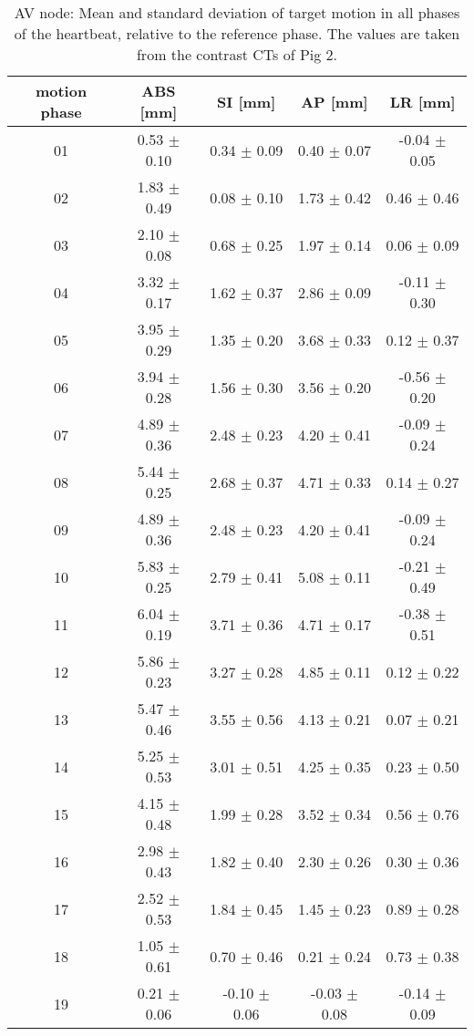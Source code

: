 \begin{table}[H]
  \centering
  \scriptsize
  \caption{AV node: Mean and standard deviation of target motion in all phases of the heartbeat, relative to the reference phase. The values are 
  taken from the contrast CTs of Pig 2.}
  \begin{tabular}{|c|c|c|c|c|}
    \hline\hline
    motion phase\rule{0pt}{2.6ex}\rule[-1.2ex]{0pt}{0pt} & ABS [mm] & SI [mm] & AP [mm] & LR [mm]\\
    \hline
01 &0.53 $\pm$ 0.10 &0.34 $\pm$ 0.09 &0.40 $\pm$ 0.07 &-0.04 $\pm$ 0.05 \\
02 &1.83 $\pm$ 0.49 &0.08 $\pm$ 0.10 &1.73 $\pm$ 0.42 &0.46 $\pm$ 0.46 \\
03 &2.10 $\pm$ 0.08 &0.68 $\pm$ 0.25 &1.97 $\pm$ 0.14 &0.06 $\pm$ 0.09 \\
04 &3.32 $\pm$ 0.17 &1.62 $\pm$ 0.37 &2.86 $\pm$ 0.09 &-0.11 $\pm$ 0.30 \\
05 &3.95 $\pm$ 0.29 &1.35 $\pm$ 0.20 &3.68 $\pm$ 0.33 &0.12 $\pm$ 0.37 \\
06 &3.94 $\pm$ 0.28 &1.56 $\pm$ 0.30 &3.56 $\pm$ 0.20 &-0.56 $\pm$ 0.20 \\
07 &4.89 $\pm$ 0.36 &2.48 $\pm$ 0.23 &4.20 $\pm$ 0.41 &-0.09 $\pm$ 0.24 \\
08 &5.44 $\pm$ 0.25 &2.68 $\pm$ 0.37 &4.71 $\pm$ 0.33 &0.14 $\pm$ 0.27 \\
09 &4.89 $\pm$ 0.36 &2.48 $\pm$ 0.23 &4.20 $\pm$ 0.41 &-0.09 $\pm$ 0.24 \\
10 &5.83 $\pm$ 0.25 &2.79 $\pm$ 0.41 &5.08 $\pm$ 0.11 &-0.21 $\pm$ 0.49 \\
11 &6.04 $\pm$ 0.19 &3.71 $\pm$ 0.36 &4.71 $\pm$ 0.17 &-0.38 $\pm$ 0.51 \\
12 &5.86 $\pm$ 0.23 &3.27 $\pm$ 0.28 &4.85 $\pm$ 0.11 &0.12 $\pm$ 0.22 \\
13 &5.47 $\pm$ 0.46 &3.55 $\pm$ 0.56 &4.13 $\pm$ 0.21 &0.07 $\pm$ 0.21 \\
14 &5.25 $\pm$ 0.53 &3.01 $\pm$ 0.51 &4.25 $\pm$ 0.35 &0.23 $\pm$ 0.50 \\
15 &4.15 $\pm$ 0.48 &1.99 $\pm$ 0.28 &3.52 $\pm$ 0.34 &0.56 $\pm$ 0.76 \\
16 &2.98 $\pm$ 0.43 &1.82 $\pm$ 0.40 &2.30 $\pm$ 0.26 &0.30 $\pm$ 0.36 \\
17 &2.52 $\pm$ 0.53 &1.84 $\pm$ 0.45 &1.45 $\pm$ 0.23 &0.89 $\pm$ 0.28 \\
18 &1.05 $\pm$ 0.61 &0.70 $\pm$ 0.46 &0.21 $\pm$ 0.24 &0.73 $\pm$ 0.38 \\
19 &0.21 $\pm$ 0.06 &-0.10 $\pm$ 0.06 &-0.03 $\pm$ 0.08 &-0.14 $\pm$ 0.09 \\
    \hline\hline
  \end{tabular}
  \label{tab:motion:AV:Pig2}
\end{table}

